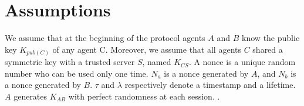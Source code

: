 \section{Assumptions}


We assume that at the beginning of the protocol agents $A$ and $B$ know the public key $K_{pub(C)}$ of any agent C.
Moreover, we assume that all agents $C$ shared a symmetric key with a trusted server $S$, named $K_{CS}$. A nonce is a unique random number who can be used only one time. $N_a$
is a nonce generated by $A$, and $N_b$ is a nonce generated by $B$. $\tau$ and $\lambda$ respectively denote a timestamp
and a lifetime. $A$ generates $K_{AB}$ with perfect randomness at each session.
.


